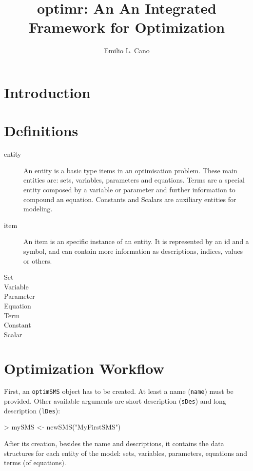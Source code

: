 \documentclass[a4paper]{article}
\title{optimr: An An Integrated Framework for Optimization}
\author{Emilio L. Cano}
\begin{document}
\maketitle

\tableofcontents

\section{Introduction}

\section{Definitions}
\begin{description}
  \item[entity] An entity is a basic type items in an optimisation problem.
  These main entities are: sets, variables, parameters and equations. Terms are
  a special entity composed by a variable or parameter and further information
  to compound an equation. Constants and Scalars are auxiliary entities for
  modeling.
  \item[item] An item is an specific instance of an entity. It is represented by
  an id and a symbol, and can contain more information as descriptions, indices,
  values or others.
  \item [Set]
  \item [Variable]
  \item [Parameter]
  \item [Equation]
  \item [Term]
  \item [Constant]
  \item [Scalar]
\end{description}

\section{Optimization Workflow}
First, an \texttt{optimSMS} object has to be created. At least a name
(\texttt{name}) must be provided. Other available arguments are short
description (\texttt{sDes}) and long description (\texttt{lDes}):

\begin{Schunk}
\begin{Sinput}
> mySMS <- newSMS("MyFirstSMS")
\end{Sinput}
\end{Schunk}

After its creation, besides the name and descriptions, it contains the data
structures for each entity of the model: sets, variables, parameters, equations
and terms (of equations).
\end{document}
